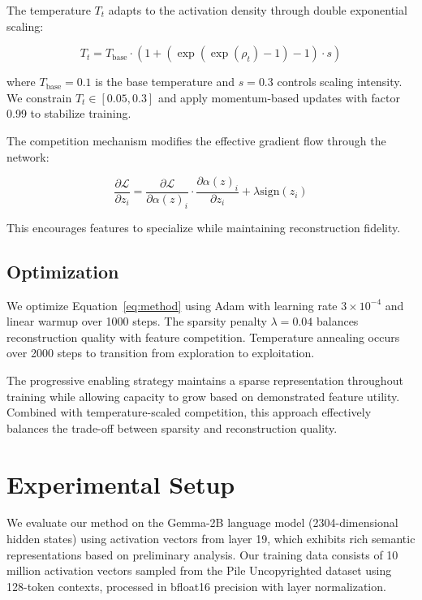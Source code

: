 \documentclass{article} %
\begin{document}
The temperature $T_t$ adapts to the activation density through double exponential scaling:

\begin{equation}
    T_t = T_{\text{base}} \cdot (1 + (\exp(\exp(\rho_t) - 1) - 1) \cdot s)
\end{equation}

where $T_{\text{base}}=0.1$ is the base temperature and $s=0.3$ controls scaling intensity. We constrain $T_t \in [0.05, 0.3]$ and apply momentum-based updates with factor 0.99 to stabilize training.

The competition mechanism modifies the effective gradient flow through the network:

\begin{equation}
    \frac{\partial \mathcal{L}}{\partial z_i} = \frac{\partial \mathcal{L}}{\partial \alpha(z)_i} \cdot \frac{\partial \alpha(z)_i}{\partial z_i} + \lambda \text{sign}(z_i)
\end{equation}

This encourages features to specialize while maintaining reconstruction fidelity.

\subsection{Optimization}
We optimize Equation~\ref{eq:method} using Adam with learning rate $3\times10^{-4}$ and linear warmup over 1000 steps. The sparsity penalty $\lambda=0.04$ balances reconstruction quality with feature competition. Temperature annealing occurs over 2000 steps to transition from exploration to exploitation.

The progressive enabling strategy maintains a sparse representation throughout training while allowing capacity to grow based on demonstrated feature utility. Combined with temperature-scaled competition, this approach effectively balances the trade-off between sparsity and reconstruction quality.

\section{Experimental Setup}
\label{sec:experimental}

We evaluate our method on the Gemma-2B language model (2304-dimensional hidden states) using activation vectors from layer 19, which exhibits rich semantic representations based on preliminary analysis. Our training data consists of 10 million activation vectors sampled from the Pile Uncopyrighted dataset using 128-token contexts, processed in bfloat16 precision with layer normalization.
\end{document}

